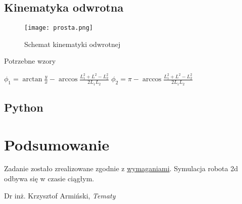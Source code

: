 \documentclass{article}
\begin{document}
\newpage

\subsection{Kinematyka odwrotna}

\begin{center}
    \begin{figure}[!ht]
\centering
\texttt{[image: prosta.png]}
\caption{\label{fig:prosta}Schemat kinematyki odwrotnej}
\end{figure}
\end{center}

Potrzebne wzory

\begin{center}
    $\phi_1 = \arctan\frac{y}{x} - \arccos\frac{L^2_1+L^2-L^2_2}{2L_1L_2}$
    $\phi_2 = \pi - \arccos\frac{L^2_1+L^2-L^2_2}{2L_1L_2}$
\end{center}






\newpage
\subsection{Python}



\section{Podsumowanie}
Zadanie zostało zrealizowane zgodnie z  \href{https://enauczanie.pg.edu.pl/moodle/mod/assign/view.php?id=1266783}{wymaganiami}. Symulacja robota 2d odbywa się w czasie ciągłym.





\begin{thebibliography}{9}
Dr inż. Krzysztof Armiński, \emph{Tematy}


\end{thebibliography}
\end{document}
